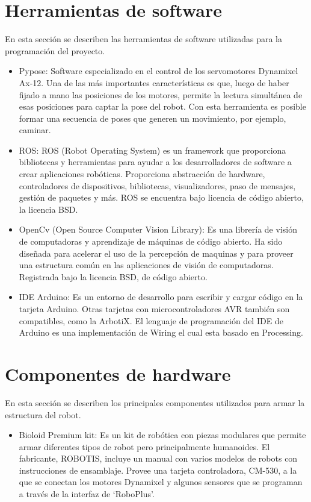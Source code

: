 \section{ Herramientas de software}
En esta sección se describen las herramientas de software utilizadas para la programación del proyecto.
\begin{itemize}
\item Pypose: Software especializado en el control de los servomotores Dynamixel Ax-12. Una de las más importantes
características es que, luego de haber fijado a mano las posiciones de los motores, permite la lectura simultánea de esas
posiciones para captar la pose del robot. Con esta herramienta es posible formar una secuencia de poses que generen un
movimiento, por ejemplo, caminar. \cite{pypose}

\item ROS: ROS (Robot Operating System) es un framework que proporciona bibliotecas y herramientas para ayudar a los desarrolladores de software a crear aplicaciones robóticas. Proporciona abstracción de hardware, controladores de dispositivos, bibliotecas, visualizadores, paso de mensajes, gestión de paquetes y más. ROS se encuentra bajo licencia de código abierto, la licencia BSD.

\item OpenCv (Open Source Computer Vision Library): Es una librería de visión de computadoras y aprendizaje de máquinas de código abierto. Ha sido diseñada para acelerar el uso de la percepción de maquinas y para proveer una estructura común en las aplicaciones de visión de computadoras. Registrada bajo la licencia BSD, de código abierto. \cite{opencv}

\item IDE Arduino: Es un entorno de desarrollo para escribir y cargar código en la tarjeta Arduino. Otras tarjetas
con microcontroladores AVR también son compatibles, como la ArbotiX. El lenguaje de programación del IDE de Arduino es una
implementación de Wiring el cual esta basado en Processing.  \cite{arduino}

\end{itemize}


\section{Componentes de hardware}
En esta sección se describen los principales componentes utilizados para armar la estructura del robot.
\begin{itemize}
\item Bioloid Premium kit: Es un kit de robótica con piezas modulares que permite armar diferentes tipos de robot pero 
principalmente humanoides. El fabricante, ROBOTIS, incluye un manual con varios modelos de robots con instrucciones de 
ensamblaje. Provee una tarjeta controladora, CM-530, a la que se conectan los motores Dynamixel y algunos sensores que se 
programan a través de la interfaz de ‘RoboPlus’. \cite{robotics}

\end{itemize}

